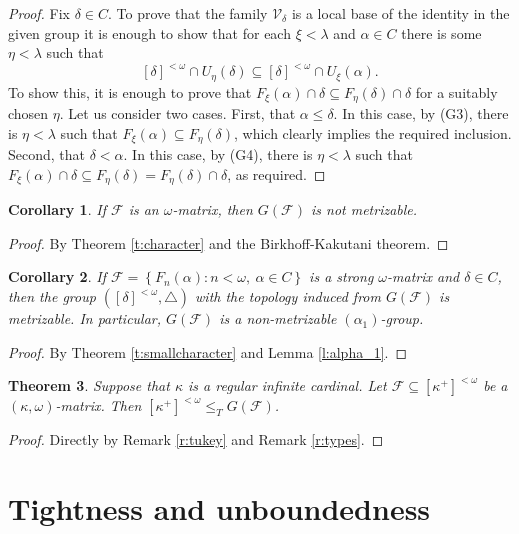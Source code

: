 \documentclass{amsart}
\theoremstyle{plain}
\newtheorem{theorem}{Theorem}[section]
\newtheorem{corollary}[theorem]{Corollary}
\theoremstyle{definition}
\numberwithin{equation}{section}
\renewcommand{\a}{\alpha}
\renewcommand{\d}{\delta}
\renewcommand{\k}{\kappa}
\renewcommand{\o}{\omega}
\renewcommand{\l}{\lambda}
\newcommand{\sst}{\subseteq}
\newcommand{\cv}{\mathcal V}
\newcommand{\set}[1]{\left\{#1\right\}}
\begin{document}
\begin{proof}
    Fix $\d\in C$.
    To prove that the family $\cv_{\d}$ is a local base of the identity in the given group it is enough to show that for each $\xi<\l$ and $\a\in C$ there is some $\eta<\l$ such that $$[\d]^{<\o}\cap U_{\eta}(\d)\sst [\d]^{<\o}\cap U_{\xi}(\a).$$
    To show this, it is enough to prove that $F_{\xi}(\a)\cap \d\sst F_{\eta}(\d)\cap \d$ for a suitably chosen $\eta$.
    Let us consider two cases.
    First, that $\a\le\d$.
    In this case, by (G3), there is $\eta<\l$ such that $F_{\xi}(\a)\sst F_{\eta}(\d)$, which clearly implies the required inclusion.
    Second, that $\d<\a$.
    In this case, by (G4), there is $\eta<\l$ such that $F_{\xi}(\a)\cap\d\sst F_{\eta}(\d)=F_{\eta}(\d)\cap\d$, as required.
\end{proof}

\begin{corollary}\label{c:nonmetrizable}
	If $\mathcal F$ is an $\o$-matrix, then $G(\mathcal F)$ is not metrizable.
\end{corollary}
\begin{proof}
	By Theorem \ref{t:character} and the Birkhoff-Kakutani theorem.
\end{proof}

\begin{corollary}\label{c:alpha_1}
	If $\mathcal F=\set{F_n(\a):n<\o,\ \a\in C}$ is a strong $\o$-matrix and $\d\in C$, then the group $([\d]^{<\o},\triangle)$ with the topology induced from $G(\mathcal F)$ is metrizable.
	In particular, $G(\mathcal F)$ is a non-metrizable $(\a_1)$-group.
\end{corollary}
\begin{proof}
	By Theorem \ref{t:smallcharacter} and Lemma \ref{l:alpha_1}.
\end{proof}

\begin{theorem}\label{t:maxtype}
	Suppose that $\k$ is a regular infinite cardinal.
	Let $\mathcal F\sst [\k^+]^{<\o}$ be a $(\k,\o)$-matrix.
	Then $[\k^+]^{<\o}\le_T G(\mathcal F)$.
\end{theorem}
\begin{proof}
	Directly by Remark \ref{r:tukey} and Remark \ref{r:types}.
\end{proof}

\section{Tightness and unboundedness}\label{s:tightness}
\end{document}
